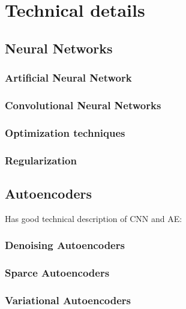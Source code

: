 
\chapter{Technical details}
\label{cha:tede}

\section{Neural Networks}

\subsection{Artificial Neural Network}
\subsection{Convolutional Neural Networks}
\subsection{Optimization techniques}
\subsection{Regularization}






\section{Autoencoders}
Has good technical description of CNN and AE: \cite{Masci2011}

\subsection{Denoising Autoencoders}
\subsection{Sparce Autoencoders}
\subsection{Variational Autoencoders}
